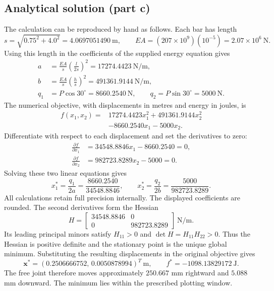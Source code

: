 \documentclass[11pt,a4paper]{article}
\begin{document}
\subsection{Analytical solution (part c)}
The calculation can be reproduced by hand as follows. Each bar has length
\[
s=\sqrt{0.75^2+4.0^2}=4.0697051490\ \mathrm m,
\qquad EA=(207\times10^9)(10^{-5})=2.07\times10^6\ \mathrm N.
\]
Using this length in the coefficients of the supplied energy equation gives
\begin{align*}
a&=\frac{EA}{s}\left(\frac{l}{2s}\right)^2=17274.4423\ \mathrm{N/m},\\
b&=\frac{EA}{s}\left(\frac{h}{s}\right)^2=491361.9144\ \mathrm{N/m},\\
q_1&=P\cos30^\circ=8660.2540\ \mathrm N,\qquad
q_2=P\sin30^\circ=5000\ \mathrm N.
\end{align*}
The numerical objective, with displacements in metres and energy in joules, is
\[
\begin{split}
f(x_1,x_2)={}&17274.4423x_1^2+491361.9144x_2^2\\
&-8660.2540x_1-5000x_2.
\end{split}
\]
Differentiate with respect to each displacement and set the derivatives to zero:
\begin{align*}
\frac{\partial f}{\partial x_1}&=34548.8846x_1-8660.2540=0,\\
\frac{\partial f}{\partial x_2}&=982723.8289x_2-5000=0.
\end{align*}
Solving these two linear equations gives
\[
x_1^*=\frac{q_1}{2a}=\frac{8660.2540}{34548.8846},\qquad
x_2^*=\frac{q_2}{2b}=\frac{5000}{982723.8289}.
\]
All calculations retain full precision internally. The displayed coefficients
are rounded. The second derivatives form the Hessian
\[
H=\begin{bmatrix}34548.8846&0\\0&982723.8289\end{bmatrix}\ \mathrm{N/m}.
\]
Its leading principal minors satisfy $H_{11}>0$ and
$\det H=H_{11}H_{22}>0$. Thus the Hessian is positive definite and the
stationary point is the unique global minimum. Substituting the resulting
displacements in the original objective gives
\[
 \boxed{\bm x^*=(0.2506666752,\,0.0050878994)^T\ \mathrm{m}},
 \qquad f^*=-1098.13829172\ \mathrm{J}.
\]
The free joint therefore moves approximately $250.667$ mm rightward and
$5.088$ mm downward. The minimum lies within the prescribed plotting window.

\clearpage
\end{document}
